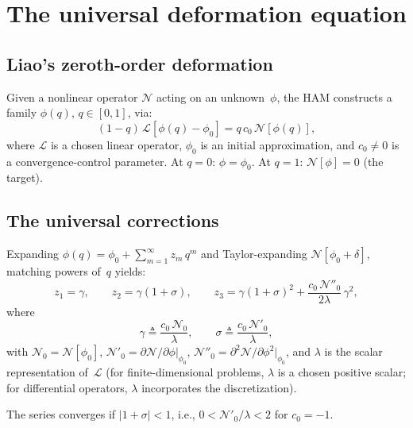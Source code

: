 \documentclass[11pt,a4paper]{article}
\begin{document}
\section{The universal deformation equation}
\label{sec:universal}

\subsection{Liao's zeroth-order deformation}

Given a nonlinear operator $\mathcal{N}$ acting on an unknown~$\phi$, the HAM constructs a family $\phi(q)$, $q \in [0,1]$, via:
\begin{equation}
(1-q)\,\mathcal{L}[\phi(q) - \phi_0] = q\,c_0\,\mathcal{N}[\phi(q)],
\label{eq:deformation}
\end{equation}
where $\mathcal{L}$ is a chosen linear operator, $\phi_0$ is an initial approximation, and $c_0 \neq 0$ is a convergence-control parameter. At $q = 0$: $\phi = \phi_0$. At $q = 1$: $\mathcal{N}[\phi] = 0$ (the target).

\subsection{The universal corrections}

Expanding $\phi(q) = \phi_0 + \sum_{m=1}^{\infty} z_m\,q^m$ and Taylor-expanding $\mathcal{N}[\phi_0 + \delta]$, matching powers of~$q$ yields:
\begin{equation}
\boxed{z_1 = \gamma, \qquad z_2 = \gamma(1+\sigma), \qquad z_3 = \gamma(1+\sigma)^2 + \frac{c_0\,\mathcal{N}''_0}{2\lambda}\,\gamma^2,}
\label{eq:z123}
\end{equation}
where
\begin{equation}
\gamma \triangleq \frac{c_0\,\mathcal{N}_0}{\lambda}, \qquad \sigma \triangleq \frac{c_0\,\mathcal{N}'_0}{\lambda},
\label{eq:gamma-sigma}
\end{equation}
with $\mathcal{N}_0 = \mathcal{N}[\phi_0]$, $\mathcal{N}'_0 = \partial\mathcal{N}/\partial\phi\big|_{\phi_0}$, $\mathcal{N}''_0 = \partial^2\mathcal{N}/\partial\phi^2\big|_{\phi_0}$, and $\lambda$ is the scalar representation of~$\mathcal{L}$ (for finite-dimensional problems, $\lambda$ is a chosen positive scalar; for differential operators, $\lambda$ incorporates the discretization).

The series converges if $|1 + \sigma| < 1$, i.e., $0 < \mathcal{N}'_0/\lambda < 2$ for $c_0 = -1$.
\end{document}
